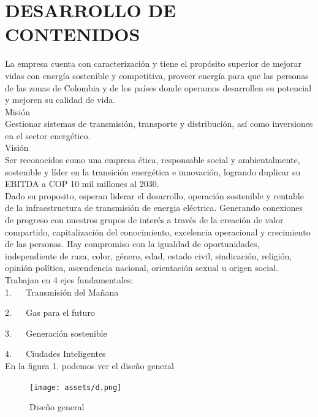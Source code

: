 \section {DESARROLLO DE CONTENIDOS}La empresa cuenta con caracterización y tiene el propósito superior de mejorar vidas con energía sostenible y competitiva, proveer energía para que las personas de las zonas de Colombia y de los países donde operamos desarrollen su potencial y mejoren su calidad de vida. 
\\

Misión\\ 
Gestionar sistemas de transmisión, transporte y distribución, así como inversiones en el sector energético.
\\

Visión\\ 
Ser reconocidos como una empresa ética, responsable social y ambientalmente, sostenible y líder en la transición energética e innovación, logrando duplicar su EBITDA a COP 10 mil millones al 2030.
\\

Dado su proposito, esperan liderar el desarrollo, operación sostenible y rentable de la infraestructura de transmisión de energia eléctrica. Generando conexiones de progreso con nuestros grupos de interés a través de la creación de valor compartido, capitalización del conocimiento, excelencia operacional y crecimiento de las personas. 
Hay compromiso con la igualdad de oportunidades, independiente de raza, color, género, edad, estado civil, sindicación, religión, opinión política, ascendencia nacional, orientación sexual u origen social.
\\

Trabajan en 4 ejes fundamentales:\\

1.    Transmisión del Mañana

2.    Gas para el futuro

3.    Generación sostenible

4.    Ciudades Inteligentes \\

En la figura 1. podemos ver el diseño general
\begin{figure}[htb]
\centering
\texttt{[image: assets/d.png]}
\caption{Diseño general}
\label{fig:modelo}
\end{figure}
\label{sec:Background} \\

